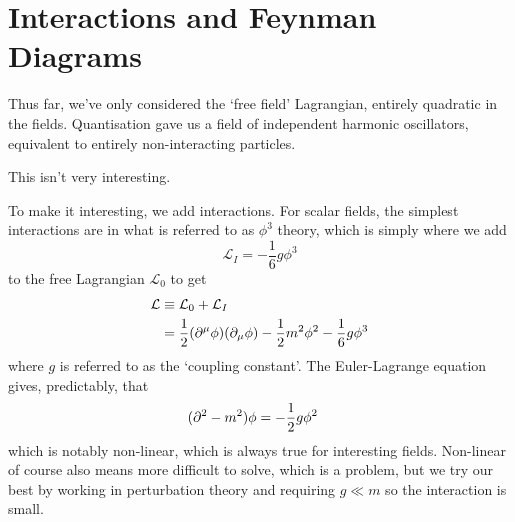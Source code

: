 \documentclass[notes.tex]{subfiles}
\begin{document}
\chapter{Interactions and Feynman Diagrams}
\label{chap:rqft_interactions}
Thus far, we've only considered the `free field' Lagrangian, entirely quadratic in the fields. Quantisation gave us a field of independent harmonic oscillators, equivalent to entirely non-interacting particles.

This isn't very interesting.

To make it interesting, we add interactions. For scalar fields, the simplest interactions are in what is referred to as $\phi^3$ theory, which is simply where we add \[\mathcal{L}_I = -\frac{1}{6} g \phi^3\] to the free Lagrangian $\mathcal{L}_0$ to get
\begin{align*}
	\mathcal{L} & \equiv \mathcal{L}_0 + \mathcal{L}_I                                               \\
	            & = \frac{1}{2}(\partial^\mu\phi)(\partial_\mu\phi) - \frac{1}{2} m^2\phi^2 - \frac{1}{6}g\phi^3
\end{align*}
where $g$ is referred to as the `coupling constant'.
The Euler-Lagrange equation gives, predictably, that
\begin{align*}
	(\partial^2 - m^2)\phi & = -\frac{1}{2}{}g\phi^2
\end{align*}
which is notably non-linear, which is always true for interesting fields.
Non-linear of course also means more difficult to solve, which is a problem, but we try our best by working in perturbation theory and requiring $g\ll m$ so the interaction is small.
\end{document}
